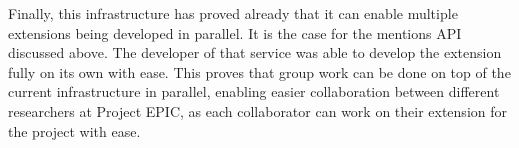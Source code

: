 Finally, this infrastructure has proved already that it can enable multiple extensions being developed in parallel. It is the case for the mentions API discussed above. The developer of that service was able to develop the extension fully on its own with ease. This proves that group work can be done on top of the current infrastructure in parallel, enabling easier collaboration between different researchers at Project EPIC, as each collaborator can work on their extension for the project with ease.
